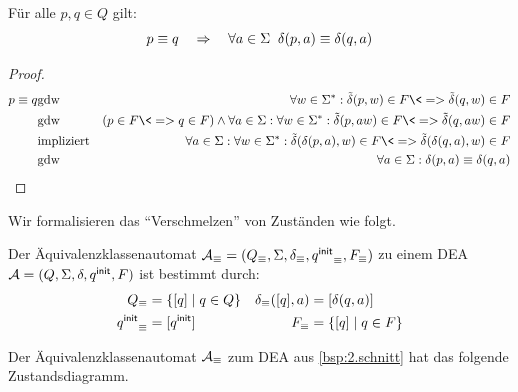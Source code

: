\begin{lemma}
\label{eqn:delta-wohldefiniert}
Für alle $p,q\in Q$ gilt:
        $$p \equiv q \quad\=>\quad \forall a\in\Sigma\;\; \delta(p,a)\equiv\delta(q,a)$$
\end{lemma}
\begin{proof}
\begin{eqnarray*}
        p \equiv q  
        & \text{gdw} & \forall w\in\Sigma^*: \tilde\delta(p,w)\in F \<=> \tilde\delta(q,w) \in F\\
        & \text{gdw} & (p\in F \<=> q \in F) \land \forall a\in \Sigma: \forall w\in\Sigma^*:
        \tilde\delta(p,aw)\in F \<=> \tilde\delta(q,aw)\in F\\
        &\text{impliziert} &  \forall a\in\Sigma: \forall w\in\Sigma^*: \tilde\delta(\delta(p,a),w)\in F \<=> \tilde\delta(\delta(q,a),w)\in F\\
        & \text{gdw} & \forall a\in\Sigma: \delta(p,a)\equiv\delta(q,a)
\end{eqnarray*}
\end{proof}
Wir formalisieren das ``Verschmelzen'' von Zuständen wie folgt.
\begin{Def}[name={[Äquivalenzklassenautomat]}]
        Der Äquivalenzklassenautomat $\mathcal{A}_\equiv=(Q_\equiv,\Sigma,\delta_\equiv,{{q^\mathsf{init}}}_\equiv,F_\equiv)$ zu einem DEA $\mathcal{A}=(Q,\Sigma,\delta,{q^\mathsf{init}},F)$ ist bestimmt durch:
        \begin{align*}
                Q_\equiv &= \{[q]\mid q\in Q\} & \delta_\equiv([q],a) &= [\delta(q,a)]\\
                {q^\mathsf{init}}_\equiv &= [{q^\mathsf{init}}] & F_\equiv & =\{[q]\mid q\in F \}
        \end{align*}
\end{Def}

\begin{Bsp}
Der Äquivalenzklassenautomat $\mathcal{A}_\equiv$ zum \ac{DEA} aus \autoref{bsp:2.schnitt} hat das folgende Zustandsdiagramm.
\begin{center}
   \captionsetup{type=figure}
 
\end{center}
\end{Bsp}



